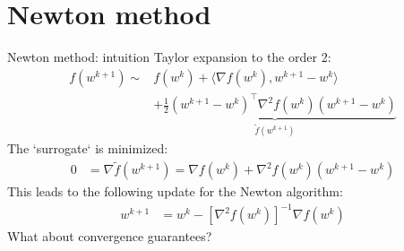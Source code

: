 
\section{Newton method}


\begin{frame}{Newton method: intuition}
%
\alert{Taylor expansion} to the order 2:
%
    \begin{align*}
        f(w^{k+1}) 
        \sim &
        f(w^{k}) 
        + \langle \nabla f (w^{k}), w^{k+1} - w^{k} \rangle 
        \\
        &\underbrace{+ \frac{1}{2} (w^{k+1} - w^{k})^\top \nabla^2 f (w^{k}) (w^{k+1} - w^{k})}_{\tilde{f}(w^{k+1})}
    \end{align*}
%
\pause
%
The \alert{`surrogate`} is minimized:
    \begin{align*}
        0 
        & = \nabla \tilde{f}(w^{k+1})
        = \nabla f (w^{k})
        + \nabla^2 f (w^{k}) (w^{k+1} - w^{k})
    \end{align*}
%
\pause
%
This leads to the following update for the \alert{Newton algorithm}:
    \begin{align*}
        w^{k+1} 
        &= 
        w^{k} 
        - [\nabla^2 f (w^{k})]^{-1} \nabla f (w^{k})
    \end{align*}
%
\pause
%
\center
What about convergence guarantees?
\end{frame}


